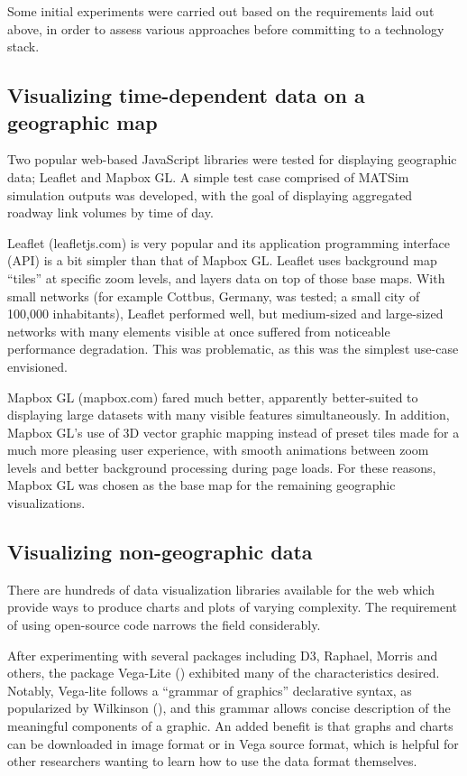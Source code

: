Some initial experiments were carried out based on the requirements laid out above, in order to assess various approaches before committing to a technology stack.

\hypertarget{mathub-visualizing-time-dependent-data-on-a-geographic-map}{%
\subsection{Visualizing time-dependent data on a geographic
map}\label{visualizing-time-dependent-data-on-a-geographic-map}}

Two popular web-based JavaScript libraries were tested for displaying geographic data; Leaflet and Mapbox GL. A simple test case comprised of MATSim simulation outputs was developed, with the goal of displaying aggregated roadway link volumes by time of day.

Leaflet (leafletjs.com) is very popular and its application programming interface (API) is a bit simpler than that of Mapbox GL. Leaflet uses background map ``tiles'' at specific zoom levels, and layers data on top of those base maps. With small networks (for example Cottbus, Germany, was tested; a small city of 100,000 inhabitants), Leaflet performed well, but medium-sized and large-sized networks with many elements visible at once suffered from noticeable performance degradation. This was problematic, as this was the simplest use-case envisioned.

Mapbox GL (mapbox.com) fared much better, apparently better-suited to displaying large datasets with many visible features simultaneously. In addition, Mapbox GL's use of 3D vector graphic mapping instead of preset tiles made for a much more pleasing user experience, with smooth animations between zoom levels and better background processing during page loads. For these reasons, Mapbox GL was chosen as the base map for the remaining geographic visualizations.

\hypertarget{visualizing-non-geographic-data}{%
\subsection{Visualizing non-geographic data}\label{visualizing-non-geographic-data}}

There are hundreds of data visualization libraries available for the web which provide ways to produce charts and plots of varying complexity. The requirement of using open-source code narrows the field considerably.

After experimenting with several packages including D3, Raphael, Morris and others, the package Vega-Lite (\cite{Satyanarayan2016vega}) exhibited many of the characteristics desired. Notably, Vega-lite follows a ``grammar of graphics'' declarative syntax, as popularized by Wilkinson (\cite{Wilkinson2012grammar}), and this grammar allows concise description of the meaningful components of a graphic. An added benefit is that graphs and charts can be downloaded in image format or in Vega source format, which is helpful for other researchers wanting to learn how to use the data format themselves.

